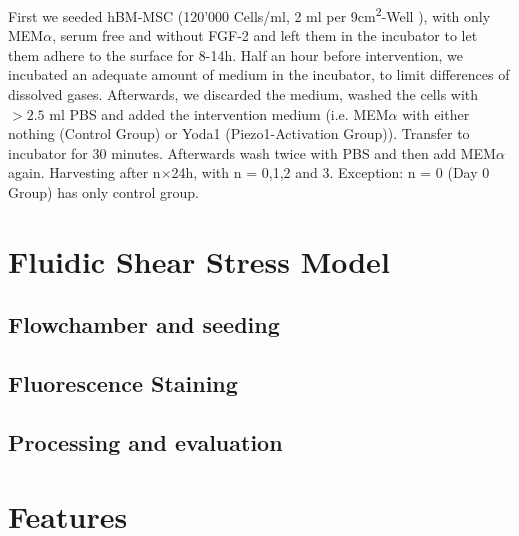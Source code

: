First we seeded hBM-MSC (120'000 Cells/ml, 2 ml per 9cm\textsuperscript{2}-Well ), with only MEM$\alpha$, serum free and without FGF-2 and left them in the incubator  to let them adhere to the surface for 8-14h. Half an hour before intervention, we incubated an adequate amount of medium in the incubator, to limit differences of dissolved gases. Afterwards, we discarded the medium, washed the cells with $> 2.5$ ml PBS and added the intervention medium (i.e. MEM$\alpha$ with either nothing (Control Group) or  Yoda1 (Piezo1-Activation Group)). Transfer to incubator for 30 minutes. Afterwards wash twice with PBS and then add MEM$\alpha$ again. Harvesting after n$\times$24h, with n = 0,1,2 and 3. Exception: n = 0 (Day 0 Group) has only control group. 


\section{Fluidic Shear Stress Model}

\subsection{Flowchamber and seeding}

\subsection{Fluorescence Staining}



\subsection{Processing and evaluation}

\section{Features}

